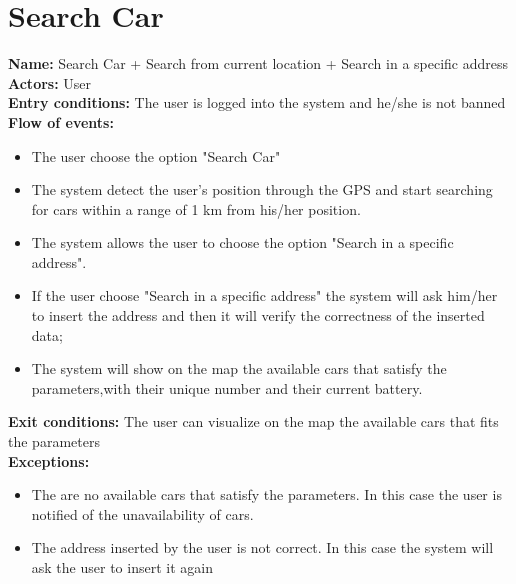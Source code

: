 \section*{Search Car}
\textbf{Name:} Search Car + Search from current location + Search in a specific address\\
\textbf{Actors:} User\\
\textbf{Entry conditions:} The user is logged into the system and he/she is not banned\\
\textbf{Flow of events:}
\begin{itemize}
\item The user choose the option "Search Car"
\item The system detect the user's position through the GPS and start searching for cars within a range of 1 km from his/her position.
\item The system allows the user to choose the option "Search in a specific address".
\item If the user choose "Search in a specific address" the system will ask him/her to insert the address and then it will verify the correctness of the inserted data;
\item The system will show on the map the available cars that satisfy the parameters,with their unique number and their current battery.
\end{itemize}
\textbf{Exit conditions:} The user can visualize on the map the available cars that fits the parameters \\
\textbf{Exceptions:}  
\begin{itemize}
\item The are no available cars that satisfy the parameters. In this case the user is notified of the unavailability of cars.
\item The address inserted by the user is not correct. In this case the system will ask the user to insert it again
\end{itemize}

